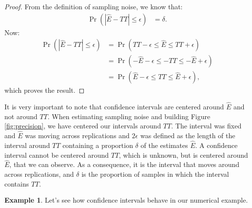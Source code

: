 \documentclass[
]{book}
\theoremstyle{definition}
\theoremstyle{definition}
\newtheorem{example}{Example}[chapter]
\theoremstyle{definition}
\theoremstyle{definition}
\theoremstyle{remark}
\begin{document}
\begin{proof}
\iffalse{} {Proof. } \fi{}From the definition of sampling noise, we know that:
\begin{align*}
  \Pr(|\hat{E}-TT|\leq\epsilon) & = \delta.
\end{align*}
Now:
\begin{align*}
  \Pr(|\hat{E}-TT|\leq\epsilon) & = \Pr(TT-\epsilon\leq\hat{E}\leq TT+\epsilon)\\
                                & = \Pr(-\hat{E}-\epsilon\leq-TT\leq -\hat{E}+\epsilon)\\
                                & = \Pr(\hat{E}-\epsilon\leq TT\leq\hat{E}+\epsilon),
\end{align*}
which proves the result.
\end{proof}

It is very important to note that confidence intervals are centered around \(\hat{E}\) and not around \(TT\).
When estimating sampling noise and building Figure \ref{fig:precision}, we have centered our intervals around \(TT\).
The interval was fixed and \(\hat{E}\) was moving across replications and \(2\epsilon\) was defined as the length of the interval around \(TT\) containing a proportion \(\delta\) of the estimates \(\hat{E}\).
A confidence interval cannot be centered around \(TT\), which is unknown, but is centered around \(\hat{E}\), that we can observe.
As a consequence, it is the interval that moves around across replications, and \(\delta\) is the proportion of samples in which the interval contains \(TT\).

\begin{example}
\protect\hypertarget{exm:unnamed-chunk-36}{}{\label{exm:unnamed-chunk-36} }Let's see how confidence intervals behave in our numerical example.
\end{example}
\end{document}
